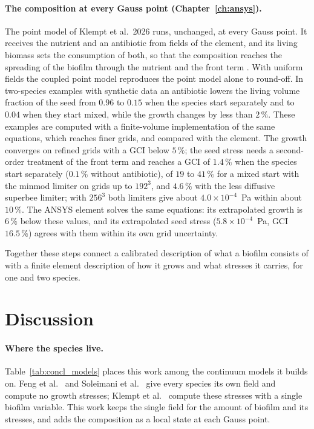 \paragraph{The composition at every Gauss point (Chapter~\ref{ch:ansys}).}
The point model of Klempt et al.\ 2026 runs, unchanged, at every Gauss point. It
receives the nutrient and an antibiotic from fields of the element, and its living
biomass sets the consumption of both, so that the composition reaches the spreading
of the biofilm through the nutrient and the front term \fterm{}. With uniform fields the
coupled point model reproduces the point model alone to round-off. In two-species
examples with synthetic data an antibiotic lowers the living volume fraction of the
seed from $0.96$ to $0.15$ when the species start separately and to $0.04$ when they
start mixed, while the growth changes by less than $2\,\%$. These examples are computed with
a finite-volume implementation of the same equations, which reaches finer grids, and compared with the
element. The growth converges on
refined grids with a GCI below $5\,\%$; the seed stress needs a second-order
treatment of the front term \fterm{} and reaches a GCI of $1.4\,\%$ when the species start
separately ($0.1\,\%$ without antibiotic), of $19$ to $41\,\%$ for a mixed start with the minmod limiter on
grids up to $192^3$, and $4.6\,\%$ with the less diffusive superbee limiter; with $256^3$ both limiters give
about $4.0\times10^{-4}$~Pa within about $10\,\%$. The ANSYS element solves the same
equations: its extrapolated growth is $6\,\%$ below these values, and its extrapolated seed stress
($5.8\times10^{-4}$~Pa, GCI $16.5\,\%$) agrees with them within its own grid uncertainty.

Together these steps connect a calibrated description of what a biofilm
consists of with a finite element description of how it grows and what
stresses it carries, for one and two species.

\section{Discussion}
\label{sec:concl_discussion}

\paragraph{Where the species live.} Table~\ref{tab:concl_models} places this
work among the continuum models it builds on. Feng et
al.~\cite{Feng2021SymbioticBiofilm} and Soleimani et
al.~\cite{Soleimani2023CoAggregation} give every species its own field and
compute no growth stresses; Klempt et al.~\cite{Klempt2024DiffusionDrivenGrowth}
compute these stresses with a single biofilm variable. This work keeps the
single field for the amount of biofilm and its stresses, and adds the
composition as a local state at each Gauss point.

